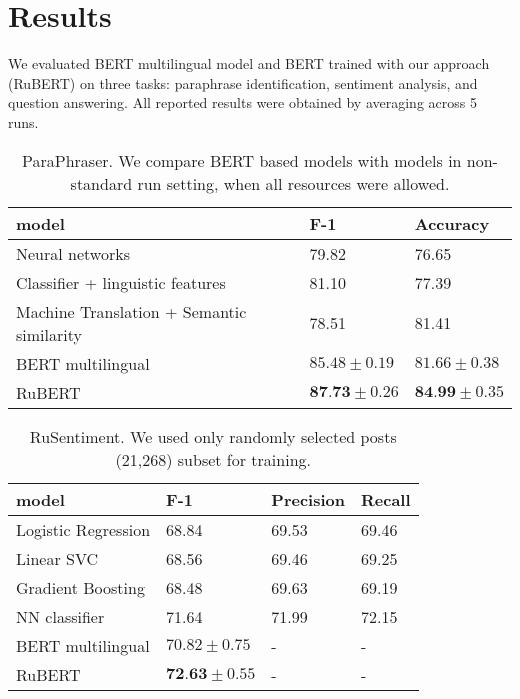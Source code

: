 \documentclass{article}
\begin{document}
\section{Results}
We evaluated BERT multilingual model and BERT trained with our approach (RuBERT) on three tasks: paraphrase identification, sentiment analysis, and question answering. All reported results were obtained by averaging across 5 runs.

\begin{table}[!ht]
\centering
\begin{tabular}{l|l|l}
\hline
model                            & F-1   & Accuracy \\ \hline
Neural networks \cite{pivovarova2017paraphraser}  & 79.82 & 76.65    \\ \hline
Classifier + linguistic features \cite{pivovarova2017paraphraser} & 81.10 & 77.39    \\ \hline
Machine Translation + Semantic similarity \cite{kravchenko2017paraphrase} & 78.51 & 81.41    \\ \hline\hline
BERT multilingual                & $85.48\pm0.19$ & $81.66\pm0.38$    \\ \hline
RuBERT                           & $\textbf{87.73}\pm0.26$ & $\textbf{84.99}\pm0.35$    \\ \hline
\end{tabular}
\caption{ParaPhraser. We compare BERT based models with models in non-standard run setting, when all resources were allowed.}
\label{tab:paraphraser}
\end{table}

\begin{table}[ht!]
\centering
\begin{tabular}{l|l|l|l}
\hline
model               & F-1   & Precision & Recall \\ \hline
Logistic Regression \cite{rogers2018rusentiment} & 68.84 & 69.53     & 69.46  \\ \hline
Linear SVC \cite{rogers2018rusentiment}         & 68.56 & 69.46     & 69.25  \\ \hline
Gradient Boosting \cite{rogers2018rusentiment}   & 68.48 & 69.63     & 69.19  \\ \hline
NN classifier \cite{rogers2018rusentiment}       & 71.64 & 71.99     & 72.15  \\ \hline \hline
BERT multilingual   & $70.82\pm0.75$ & -         & -      \\ \hline
RuBERT              & $\textbf{72.63}\pm0.55$ & -         & -      \\ \hline
\end{tabular}
\caption{RuSentiment. We used only randomly selected posts (21,268) subset for training.}
\label{tab:rusentiment}
\end{table}
\end{document}
